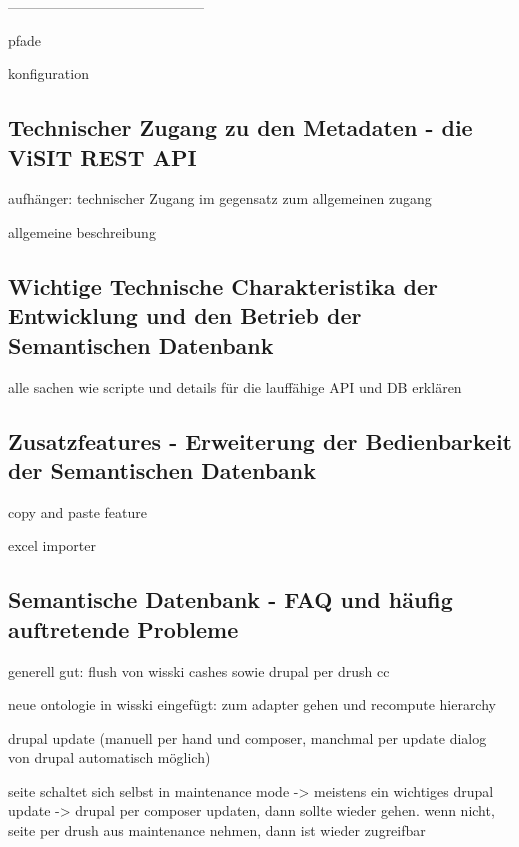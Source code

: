 ------------------------------------------

pfade

konfiguration

\subsection{Technischer Zugang zu den Metadaten - die ViSIT REST API}\label{sec:rest}

aufhänger: technischer Zugang im gegensatz zum allgemeinen zugang

allgemeine beschreibung

\subsection{Wichtige Technische Charakteristika der Entwicklung und den Betrieb der Semantischen Datenbank}\label{sec:features}

alle sachen wie scripte und details für die lauffähige API und DB erklären 

\subsection{Zusatzfeatures - Erweiterung der Bedienbarkeit der Semantischen Datenbank}\label{sec:additional_features}

copy and paste feature

excel importer

\subsection{Semantische Datenbank - FAQ und häufig auftretende Probleme}\label{sec:faqSW}

generell gut: flush von wisski cashes sowie drupal per drush cc

neue ontologie in wisski eingefügt: zum adapter gehen und recompute hierarchy

drupal update (manuell per hand und composer, manchmal per update dialog von drupal automatisch möglich)

seite schaltet sich selbst in maintenance mode -> meistens ein wichtiges drupal update -> drupal per composer updaten, dann sollte wieder gehen. wenn nicht, seite per drush aus maintenance nehmen, dann ist wieder zugreifbar










